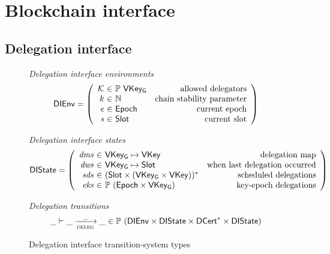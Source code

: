 \section{Blockchain interface}
\label{sec:blockchain-interface}

\newcommand{\DIEnv}{\type{DIEnv}}
\newcommand{\DIState}{\type{DIState}}

\newcommand{\UPIEnv}{\type{UPIEnv}}
\newcommand{\UPIState}{\type{UPIState}}

\subsection{Delegation interface}
\label{sec:delegation-interface}

\begin{figure}[htb]
  \emph{Delegation interface environments}
  \begin{equation*}
    \DIEnv =
    \left(
      \begin{array}{r@{~\in~}lr}
        \mathcal{K} & \powerset{\VKeyGen} & \text{allowed delegators}\\
        k & \mathbb{N} & \text{chain stability parameter}\\
        \var{e} & \Epoch & \text{current epoch}\\
        \var{s} & \Slot & \text{current slot}
      \end{array}
    \right)
  \end{equation*}

  \emph{Delegation interface states}
  \begin{equation*}
    \DIState
    = \left(
      \begin{array}{r@{~\in~}lr}
        \var{dms} & \VKeyGen \mapsto \VKey & \text{delegation map}\\
        \var{dws} & \VKeyGen \mapsto \Slot & \text{when last delegation occurred}\\
        \var{sds} & \seqof{(\Slot \times (\VKeyGen \times \VKey))} & \text{scheduled delegations}\\
        \var{eks} & \powerset{(\Epoch \times \VKeyGen)} & \text{key-epoch delegations}
      \end{array}
    \right)
  \end{equation*}

  \emph{Delegation transitions}
  \begin{equation*}
    \_ \vdash \_ \trans{deleg}{\_} \_ \in
    \powerset (\DIEnv \times \DIState \times \seqof{\DCert} \times \DIState)
  \end{equation*}
  \caption{Delegation interface transition-system types}
  \label{fig:ts-types:delegation-interface}
\end{figure}

